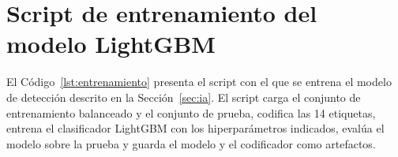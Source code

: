 \thispagestyle{empty}
\renewcommand{\thechapter}{A}

\section{Script de entrenamiento del modelo LightGBM}
\label{app:entrenamiento}

El Código~\ref{lst:entrenamiento} presenta el script con el que se entrena el modelo de detección descrito en la Sección~\ref{sec:ia}. El script carga el conjunto de entrenamiento balanceado y el conjunto de prueba, codifica las 14 etiquetas, entrena el clasificador LightGBM con los hiperparámetros indicados, evalúa el modelo sobre la prueba y guarda el modelo y el codificador como artefactos.


